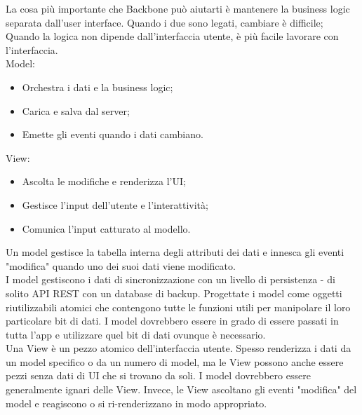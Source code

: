 \documentclass[../SpecificaTecnica.tex]{subfiles}
\begin{document}
La cosa più importante che Backbone può aiutarti è mantenere la business logic separata dall'user interface. Quando i due sono legati, cambiare è difficile; Quando la logica non dipende dall'interfaccia utente, è più facile lavorare con l'interfaccia.
\\
Model:
\begin{itemize}
\item Orchestra i dati e la business logic;
\item Carica e salva dal server;
\item Emette gli eventi quando i dati cambiano.
\end{itemize}
View:
\begin{itemize}
\item Ascolta le modifiche e renderizza l'UI;
\item Gestisce l'input dell'utente e l'interattività;
\item Comunica l'input catturato al modello.
\end{itemize}

Un model gestisce la tabella interna degli attributi dei dati e innesca gli eventi "modifica" quando uno dei suoi dati viene modificato.\\
I model gestiscono i dati di sincronizzazione con un livello di persistenza - di solito API REST con un database di backup. Progettate i model come oggetti riutilizzabili atomici che contengono tutte le funzioni utili per manipolare il loro particolare bit di dati. I model dovrebbero essere in grado di essere passati in tutta l'app e utilizzare quel bit di dati ovunque è necessario.\\

Una View è un pezzo atomico dell'interfaccia utente. Spesso renderizza i dati da un model specifico o da un numero di model, ma le View possono anche essere pezzi senza dati di UI che si trovano da soli. I model dovrebbero essere generalmente ignari delle View. Invece, le View ascoltano gli eventi "modifica" del model e reagiscono o si ri-renderizzano in modo appropriato.
\end{document}
